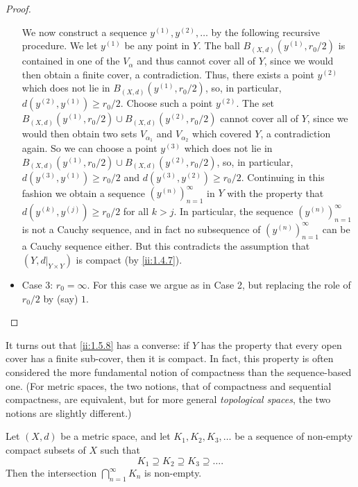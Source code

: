 \begin{proof}
\begin{itemize}
          We now construct a sequence \(y^{(1)}, y^{(2)}, \dots\) by the following recursive procedure.
          We let \(y^{(1)}\) be any point in \(Y\).
          The ball \(B_{(X, d)}(y^{(1)}, r_0 / 2)\) is contained in one of the \(V_{\alpha}\) and thus cannot cover all of \(Y\), since we would then obtain a finite cover, a contradiction.
          Thus, there exists a point \(y^{(2)}\) which does not lie in \(B_{(X, d)}(y^{(1)}, r_0 / 2)\), so, in particular, \(d(y^{(2)}, y^{(1)}) \geq r_0 / 2\).
          Choose such a point \(y^{(2)}\).
          The set \(B_{(X, d)}(y^{(1)}, r_0 / 2) \cup B_{(X, d)}(y^{(2)}, r_0 / 2)\) cannot cover all of \(Y\), since we would then obtain two sets \(V_{\alpha_1}\) and \(V_{\alpha_2}\) which covered \(Y\), a contradiction again.
          So we can choose a point \(y^{(3)}\) which does not lie in \(B_{(X, d)}(y^{(1)}, r_0 / 2) \cup B_{(X, d)}(y^{(2)}, r_0 / 2)\), so, in particular, \(d(y^{(3)}, y^{(1)}) \geq r_0 / 2\) and \(d(y^{(3)}, y^{(2)}) \geq r_0 / 2\).
          Continuing in this fashion we obtain a sequence \((y^{(n)})_{n = 1}^\infty\) in \(Y\) with the property that \(d(y^{(k)}, y^{(j)}) \geq r_0 / 2\) for all \(k > j\).
          In particular, the sequence \((y^{(n)})_{n = 1}^\infty\) is not a Cauchy sequence, and in fact no subsequence of \((y^{(n)})_{n = 1}^\infty\) can be a Cauchy sequence either.
          But this contradicts the assumption that \((Y, d|_{Y \times Y})\) is compact (by \cref{ii:1.4.7}).
    \item Case 3:
          \(r_0 = \infty\).
          For this case we argue as in Case 2, but replacing the role of \(r_0 / 2\) by (say) \(1\).
  \end{itemize}
\end{proof}

\begin{note}
  It turns out that \cref{ii:1.5.8} has a converse:
  if \(Y\) has the property that every open cover has a finite sub-cover, then it is compact.
  In fact, this property is often considered the more fundamental notion of compactness than the sequence-based one.
  (For metric spaces, the two notions, that of compactness and sequential compactness, are equivalent, but for more general \emph{topological spaces}, the two notions are slightly diﬀerent.)
\end{note}

\begin{cor}\label{ii:1.5.9}
  Let \((X, d)\) be a metric space, and let \(K_1, K_2, K_3, \dots\) be a sequence of non-empty compact subsets of \(X\) such that
  \[
    K_1 \supseteq K_2 \supseteq K_3 \supseteq \dots.
  \]
  Then the intersection \(\bigcap_{n = 1}^\infty K_n\) is non-empty.
\end{cor}

